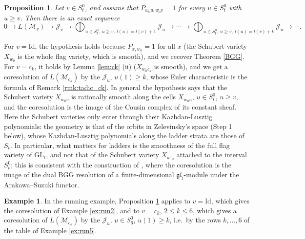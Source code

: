 \documentclass[a4paper,12pt,leqno]{amsart}
\newcommand{\caJ}{\mathcal{J}}
\newcommand{\caM}{\mathcal{M}}
\theoremstyle{plain}
\newtheorem{prop}[thm]{Proposition}
\theoremstyle{definition}
\theoremstyle{definition}
\newtheorem{example}[thm]{Example}
\newcommand{\Id}{\mathrm{Id}}
\begin{document}
\begin{prop}\label{prop:cousin} Let $v\in S_t^0$, and assume that $P_{w_0u,w_0v}=1$ for every $u\in
S_t^0$ with $u\geq v$. Then there is an exact sequence
\[0\rightarrow L(\caM_v)\rightarrow\caJ_v\rightarrow\bigoplus_{u\in S_t^0,\ u\geq v,\
l(u)=l(v)+1}\caJ_u\rightarrow\cdots\rightarrow\bigoplus_{u\in S_t^0,\ u\geq v,\ l(u)=l(v)+k}\caJ_u
\rightarrow\cdots.\]
\end{prop}

\noindent For $v=\Id$, the hypothesis holds because $P_{x,w_0}=1$ for all $x$ (the Schubert
variety $X_{w_0}$ is the whole flag variety, which is smooth), and we recover Theorem \ref{BGG}. For
$v=c_k$, it holds by Lemma \ref{lem:ck} (ii) ($X_{w_0c_k}$ is smooth), and we get a coresolution of
$L(\caM_{c_k})$ by the $\caJ_u$, $u(1)\geq k$, whose Euler characteristic is the formula of Remark
\ref{rmk:tadic_ck}. In general the hypothesis says that the Schubert variety $X_{w_0v}$ is
rationally smooth along the cells $X_{w_0u}$, $u\in S_t^0$, $u\geq v$, and the coresolution is the
image of the Cousin complex of its constant sheaf. Here the Schubert varieties only enter through their Kazhdan-Lusztig polynomials: the
geometry is that of the orbits in Zelevinsky's space (Step 1 below), whose Kazhdan-Lusztig
polynomials along the ladder strata are those of $S_t$. In particular, what matters for ladders is
the smoothness of the full flag variety of $\mathrm{GL}_t$, and not that of the Schubert variety
$X_{w'_0}$ attached to the interval $S_t^0$; this is consistent with the construction of \cite{BC15},
where the coresolution is the image of the dual BGG resolution of a finite-dimensional
$\mathfrak{gl}_t$-module under the Arakawa--Suzuki functor.


\begin{example} In the running example, Proposition \ref{prop:cousin} applies to $v=\Id$, which gives
the coresolution of Example \ref{ex:run2}, and to $v=c_k$, $2\leq k\leq6$, which gives a
coresolution of $L(\caM_{c_k})$ by the $\caJ_u$, $u\in S_6^0$, $u(1)\geq k$, i.e.\ by the rows
$k,\ldots,6$ of the table of Example \ref{ex:run5}.
\end{example}
\end{document}
